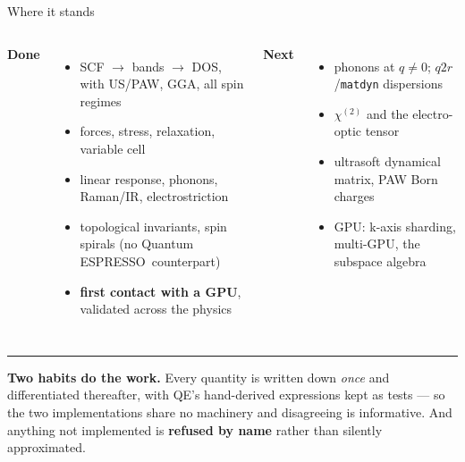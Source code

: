 \documentclass[aspectratio=169,10pt]{beamer}
\newcommand{\qe}{Quantum ESPRESSO}
\begin{document}
\begin{frame}{Where it stands}
\small
\begin{columns}[T]
\textbf{Done}
\begin{itemize}\itemsep2pt
  \item SCF $\rightarrow$ bands $\rightarrow$ DOS, with US/PAW, GGA, all spin regimes
  \item forces, stress, relaxation, variable cell
  \item linear response, phonons, Raman/IR, electrostriction
  \item topological invariants, spin spirals (no \qe\ counterpart)
  \item \textbf{first contact with a GPU}, validated across the physics
\end{itemize}
\textbf{Next}
\begin{itemize}\itemsep2pt
  \item phonons at $q\neq0$; $q2r$/\texttt{matdyn} dispersions
  \item $\chi^{(2)}$ and the electro-optic tensor
  \item ultrasoft dynamical matrix, PAW Born charges
  \item GPU: k-axis sharding, multi-GPU, the subspace algebra
\end{itemize}
\end{columns}
\vspace{6pt}
\hrule
\vspace{5pt}
\footnotesize
\textbf{Two habits do the work.} Every quantity is written down \emph{once} and
differentiated thereafter, with QE's hand-derived expressions kept as tests ---
so the two implementations share no machinery and disagreeing is informative.
And anything not implemented is \textbf{refused by name} rather than silently
approximated.
\end{frame}
\end{document}

